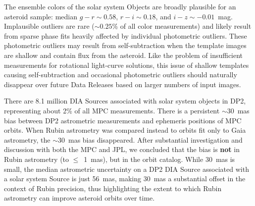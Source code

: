 The ensemble colors of the solar system Objects are broadly plausible for an asteroid sample: median $g-r \sim 0.58$, $r-i \sim 0.18$, and $i-z \sim -0.01$~mag.
Implausible outliers are rare ($\sim 0.25$\% of all color measurements) and likely result from sparse phase fits heavily affected by individual photometric outliers.
These photometric outliers may result from self-subtraction when the template images are shallow and contain \gls{flux} from the asteroid.
Like the problem of insufficient measurements for rotational light-curve solutions, this issue of shallow templates causing self-subtraction and occasional photometric outliers should naturally disappear over future Data Releases based on larger numbers of input images.

There are 8.1 million \gls{DIA} Sources associated with solar system objects in DP2, representing about 2\% of all MPC measurements.
There is a persistent $\sim30$~mas bias between DP2 astrometric measurements and \gls{ephemeris} positions of MPC orbits.
When Rubin astrometry was compared instead to orbits fit only to \gls{Gaia} astrometry, the $\sim30$~mas bias disappeared.
After substantial investigation and discussion with both the MPC and JPL, we concluded that the bias is \textbf{not} in Rubin \gls{astrometry} (to $\le$~1~mas), but in the orbit catalog.
While $30$~mas is small, the median astrometric uncertainty on a DP2 DIA \gls{Source} associated with a solar system \gls{Source} is just 56~mas, making $30$~mas a substantial offset in the context of Rubin precision, thus highlighting the extent to which Rubin astrometry can improve asteroid orbits over time.
